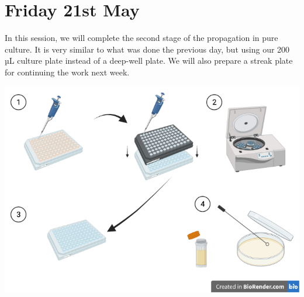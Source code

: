 \documentclass[
]{book}
\begin{document}
\hypertarget{friday-21st-may}{%
\section{Friday 21st May}\label{friday-21st-may}}

In this session, we will complete the second stage of the propagation in pure culture. It is very similar to what was done the previous day, but using our 200 µL culture plate instead of a deep-well plate. We will also prepare a streak plate for continuing the work next week.

\includegraphics{images/second-filtration.png}
\end{document}
